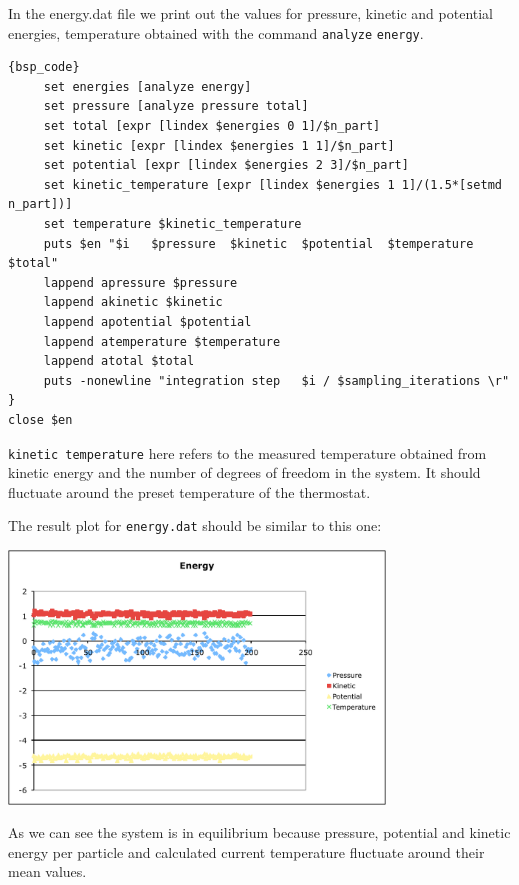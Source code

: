 \documentclass[
paper=a4,                       %
fontsize=11pt,                  %
twoside,                        %
footsepline,                    %
headsepline,                    %
headinclude=false,              %
footinclude=false,              %
pagesize,                       %
]{scrartcl}
\newtheorem{task}{Task}
\begin{document}
In the energy.dat file we print out the values for pressure, kinetic
and potential energies, temperature obtained with the command
\lstinline|analyze| \texttt{energy}.


{\small\vspace{0,2cm}
\begin{lstlisting}[firstnumber=auto]{bsp_code}
     set energies [analyze energy]
     set pressure [analyze pressure total]
     set total [expr [lindex $energies 0 1]/$n_part]
     set kinetic [expr [lindex $energies 1 1]/$n_part]
     set potential [expr [lindex $energies 2 3]/$n_part]
     set kinetic_temperature [expr [lindex $energies 1 1]/(1.5*[setmd n_part])]
     set temperature $kinetic_temperature
     puts $en "$i   $pressure  $kinetic  $potential  $temperature $total"
     lappend apressure $pressure
     lappend akinetic $kinetic
     lappend apotential $potential
     lappend atemperature $temperature
     lappend atotal $total
     puts -nonewline "integration step   $i / $sampling_iterations \r"
}
close $en
\end{lstlisting}}\vspace{0,2cm}

\noindent \texttt{kinetic temperature} here refers to the measured temperature obtained from kinetic energy and
the number of degrees of freedom in the system. It should fluctuate around the preset temperature of the thermostat.

\newpage
\vspace{1cm}\vspace{1cm}

The result plot for \texttt{energy.dat}
should be similar to this one:
\begin{center}
  \includegraphics[width=10cm]{figures/energy}
\end{center}
\noindent As we can see the system is in equilibrium because pressure, potential and kinetic energy per particle 
and calculated current temperature fluctuate around their mean values.
\end{document}
